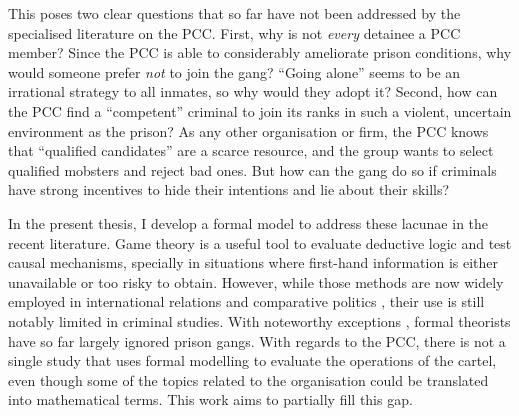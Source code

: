 This poses two clear questions that so far have not been addressed by the specialised literature on the PCC. First, why is not \textit{every} detainee a PCC member? Since the PCC is able to considerably ameliorate prison conditions, why would someone prefer \textit{not} to join the gang? ``Going alone'' seems to be an irrational strategy to all inmates, so why would they adopt it? Second, how can the PCC find a ``competent'' criminal to join its ranks in such a violent, uncertain environment as the prison? As any other organisation or firm, the PCC knows that ``qualified candidates'' are a scarce resource, and the group wants to select qualified mobsters and reject bad ones. But how can the gang do so if criminals have strong incentives to hide their intentions and lie about their skills? 


In the present thesis, I develop a formal model to address these  lacunae in the recent literature. Game theory is a useful tool to evaluate deductive logic and test causal mechanisms, specially in situations where first-hand information is either unavailable or too risky to obtain. However, while those methods are now widely employed in international relations and comparative politics  \citep[e.g.][]{de1999institutional, fearon1995rationalist, mccarty2007political}, their use is still notably limited in criminal studies. With noteworthy exceptions \citep[]{dixit2011game, lessing2014cddrl}, formal theorists have so far largely ignored prison gangs. With regards to the PCC, there is not a single study that uses formal modelling to evaluate the operations of the cartel, even though some of the topics related to the organisation could be translated into mathematical terms. This work aims to partially fill this gap.

